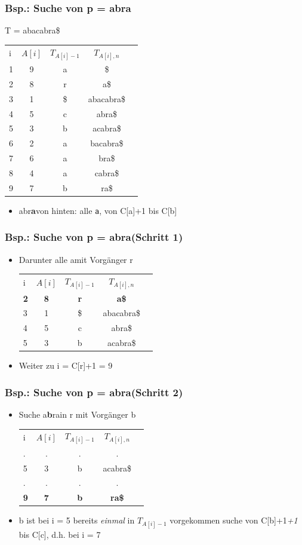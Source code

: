 \documentclass{beamer}
\begin{document}
\begin{frame}
\frametitle{Bsp.: Suche von p = \glqq abra\grqq }
T = \glqq abacabra\$\grqq \newline
\begin{tabular}{l c cc r}
i & $A[i]$ & $T_{A[i]-1}$ & $T_{A[i],n}$\\
1 & 9 & a & \$ \\
2 & 8 & r & a\$ \\
3 & 1 & \$ & abacabra\$ \\
4 & 5 & c & abra\$ \\
5 & 3 & b & acabra\$ \\
6 & 2 & a & bacabra\$ \\
7 & 6 & a & bra\$ \\
8 & 4 & a & cabra\$ \\
9 & 7 & b & ra\$ \\
\end{tabular}
\begin{itemize}
\item \glqq abr{\color{red}\textbf{a}}\grqq von hinten: alle \texttt{a}, von C[\glqq a\grqq ]+1 bis C[\glqq b\grqq ]
\end{itemize}
\end{frame}
\begin{frame}
\frametitle{Bsp.: Suche von p = \glqq abra\grqq (Schritt 1)}
\begin{itemize}
\item Darunter alle \glqq a\grqq mit Vorgänger \glqq r\grqq
\begin{tabular}{l c cc r}
i & $A[i]$ & $T_{A[i]-1}$ & $T_{A[i],n}$\\
\textbf{2} & \textbf{8} & \color{red}\textbf{r} & \textbf{a\$} \\
3 & 1 & \$ & abacabra\$ \\
4 & 5 & c & abra\$ \\
5 & 3 & b & acabra\$ \\
\end{tabular}
\item Weiter zu i = C[\glqq r\grqq]+1 = 9
\end{itemize}
\end{frame}
\begin{frame}
\frametitle{Bsp.: Suche von p = \glqq abra\grqq (Schritt 2)}
\begin{itemize}
\item Suche \glqq a\color{red}\textbf{b}\color{black}ra\grqq in r mit Vorgänger b
\begin{tabular}{l c cc r}
i & $A[i]$ & $T_{A[i]-1}$ & $T_{A[i],n}$\\
. & . & . & .\\
5 & 3 & b & acabra\$ \\
. & . & . & .\\
\textbf{9} & \textbf{7} & \color{red}\textbf{b} & \textbf{ra\$} \\
\end{tabular}
\item b ist bei i = 5 bereits \textit{einmal} in $T_{A[i]-1}$ vorgekommen \textrightarrow suche von C[\glqq b\grqq]+1\textit{+1} bis C[\glqq c\grqq], d.h. bei i = 7
\end{itemize}
\end{frame}
\end{document}
